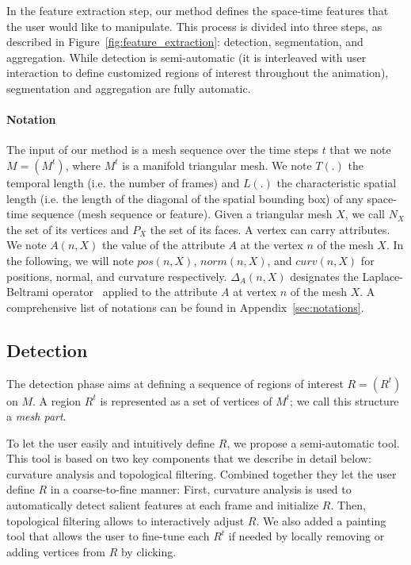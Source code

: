 \documentclass[review]{acmsiggraph}
\begin{document}
In the feature extraction step, our method defines the space-time features that the user would like to manipulate. 
This process is divided into three steps, as described in Figure~\ref{fig:feature_extraction}: detection, segmentation, and aggregation. 
While detection is semi-automatic (it is interleaved with user interaction to define customized regions of interest throughout the animation), segmentation and aggregation are fully automatic.


\paragraph{Notation}
The input of our method is a mesh sequence over the time steps $t$ that we note $M = (M^t)$, where $M^t$ is a manifold triangular mesh.
We note $T(.)$ the temporal length (i.e. the number of frames) and $L(.)$ the characteristic spatial length (i.e. the length of the diagonal of the spatial bounding box) of any space-time sequence (mesh sequence or feature).
Given a triangular mesh $X$, we call $N_X$ the set of its vertices and $P_X$ the set of its faces.
A vertex can carry attributes. We note $A(n,X)$ the value of the attribute $A$ at the vertex $n$ of the mesh $X$. In the following, we will note $pos(n,X)$, $norm(n,X)$, and $curv(n,X)$ for positions, normal, and curvature respectively.
$\Delta_{A}(n,X)$ designates the Laplace-Beltrami operator~\cite{Botsch2007} applied to the attribute $A$ at vertex $n$ of the mesh $X$.
A comprehensive list of notations can be found in Appendix~\ref{sec:notations}.

\subsection{Detection}\label{sec:features:detection}

The detection phase aims at defining a sequence of regions of interest $R = (R^t)$ on $M$.
A region $R^t$ is represented as a set of vertices of $M^t$; we call this structure a \emph{mesh part}. 

To let the user easily and intuitively define $R$, we propose a semi-automatic tool.
This tool is based on two key components that we describe in detail below: 
curvature analysis and topological filtering.
Combined together they let the user define $R$ in a coarse-to-fine manner: 
First, curvature analysis is used to automatically detect salient features at each frame and initialize $R$. 
Then, topological filtering allows to interactively adjust $R$. 
We also added a painting tool that allows the user to fine-tune each $R^t$ if needed by locally removing or adding vertices from $R$ by clicking.
\end{document}
